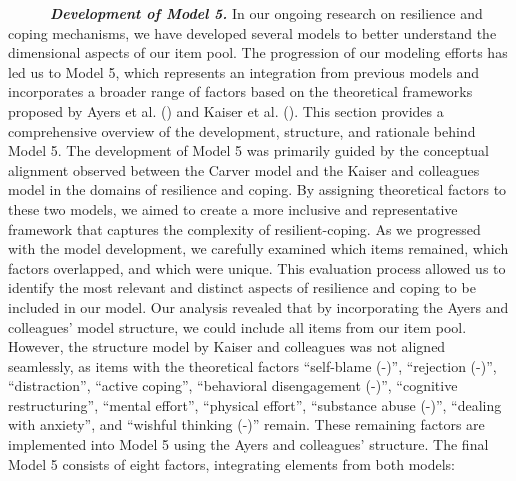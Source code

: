 \documentclass[
  man,floatsintext]{apa7}
\begin{document}
~~~~~~\textbf{\emph{Development of Model 5.}} In our ongoing research on resilience and coping mechanisms, we have developed several models to better understand the dimensional aspects of our item pool. The progression of our modeling efforts has led us to Model 5, which represents an integration from previous models and incorporates a broader range of factors based on the theoretical frameworks proposed by Ayers et al. () and Kaiser et al. (). This section provides a comprehensive overview of the development, structure, and rationale behind Model 5. The development of Model 5 was primarily guided by the conceptual alignment observed between the Carver model and the Kaiser and colleagues model in the domains of resilience and coping. By assigning theoretical factors to these two models, we aimed to create a more inclusive and representative framework that captures the complexity of resilient-coping. As we progressed with the model development, we carefully examined which items remained, which factors overlapped, and which were unique. This evaluation process allowed us to identify the most relevant and distinct aspects of resilience and coping to be included in our model. Our analysis revealed that by incorporating the Ayers and colleagues' model structure, we could include all items from our item pool. However, the structure model by Kaiser and colleagues was not aligned seamlessly, as items with the theoretical factors ``self-blame (-)'', ``rejection (-)'', ``distraction'', ``active coping'', ``behavioral disengagement (-)'', ``cognitive restructuring'', ``mental effort'', ``physical effort'', ``substance abuse (-)'', ``dealing with anxiety'', and ``wishful thinking (-)'' remain. These remaining factors are implemented into Model 5 using the Ayers and colleagues' structure. The final Model 5 consists of eight factors, integrating elements from both models:

\newpage
\end{document}
